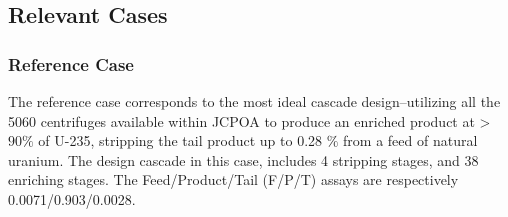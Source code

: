 \documentclass{anstrans}
\begin{document}
\subsection{Relevant Cases}
\subsubsection{Reference Case}
The reference case corresponds to the most ideal cascade design--utilizing all the 5060
centrifuges available within JCPOA to produce an enriched product at >$90\%$ of U-235,
stripping the tail product up to 0.28 $\%$ from a feed of natural uranium.
The design cascade in this case, includes 4 stripping stages, and 38 enriching
stages. The Feed/Product/Tail (F/P/T) assays are respectively
0.0071/0.903/0.0028.
\end{document}
